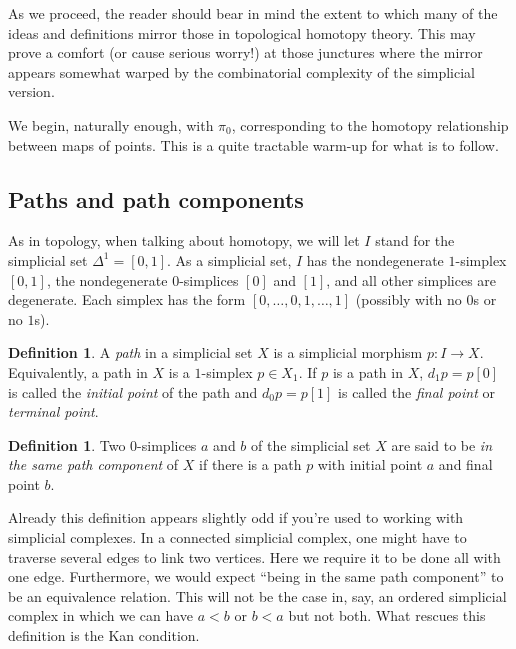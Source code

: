 \documentclass[12pt]{article}
\theoremstyle{plain}
\theoremstyle{definition}
\newtheorem{definition}[theorem]{Definition}
\theoremstyle{remark}
\begin{document}
As we proceed, the reader should bear in mind the extent to which many of the ideas and definitions mirror those in topological homotopy theory. This may prove a comfort (or cause serious worry!) at those junctures where the mirror appears somewhat warped by the combinatorial complexity of the simplicial version.

We begin, naturally enough, with $\pi_0$, corresponding to the homotopy relationship between maps of points. This is a quite tractable warm-up for what is to follow.

\subsection{Paths and path components}

As in topology, when talking about homotopy, we will let $I$ stand for the simplicial set $\Delta^1=[0,1]$. As a simplicial set, $I$ has the nondegenerate $1$-simplex $[0,1]$, the nondegenerate $0$-simplices $[0]$ and $[1]$, and all other simplices are degenerate. Each simplex has the form $[0,\ldots,0,1,\ldots, 1]$ (possibly with no $0$s or no $1$s). 

\begin{definition}
A \emph{path} in a simplicial set $X$ is a simplicial morphism $p\colon I\to X$. Equivalently, a path in $X$ is a $1$-simplex $p\in X_1$. If $p$ is a path in $X$, $d_1p=p[0]$ is called the \emph{initial point} of the path and $d_0p=p[1]$ is called the \emph{final point} or \emph{terminal point}. 
\end{definition}



\begin{definition}
Two $0$-simplices $a$ and $b$ of the simplicial set $X$ are said to be \emph{in the same path component} of $X$ if there is a path $p$ with initial point $a$ and final point $b$.
\end{definition}

Already this definition appears slightly odd if you're used to working with simplicial complexes. In a connected simplicial complex, one might have to traverse several edges to link two vertices. Here we require it to be done all with one edge. Furthermore, we would expect ``being in the same path component'' to be an equivalence relation. This will not be the case in, say, an ordered simplicial complex in which we can have $a<b$ or $b<a$ but not both. What rescues this definition is the Kan condition.
\end{document}
